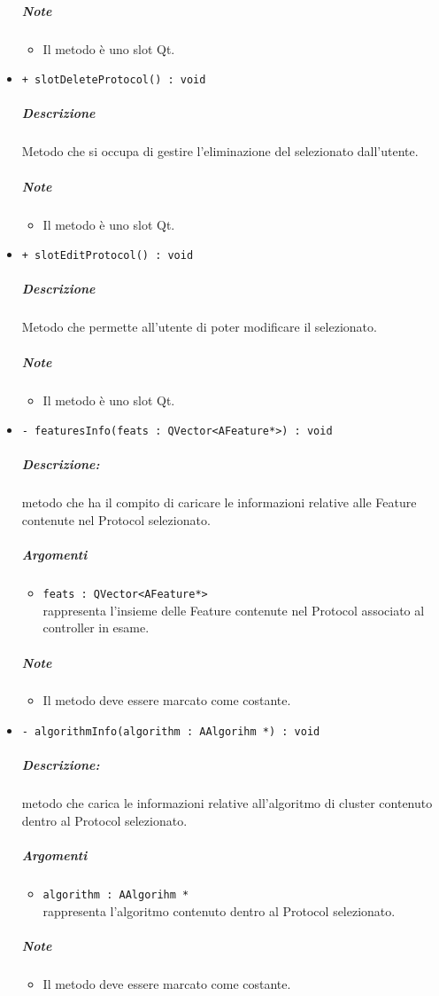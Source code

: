 \begin{itemize}
			\subparagraph{Note}
			\begin{itemize}
				\item Il metodo è uno slot\g{} Qt\g{}.
			\end{itemize}
			\item \color{blue} \verb!+ slotDeleteProtocol() : void!
			\color{black}
			\subparagraph{Descrizione} Metodo che si occupa di gestire l'eliminazione del \protocol{} selezionato dall'utente.
			\subparagraph{Note}
			\begin{itemize}
				\item Il metodo è uno slot\g{} Qt\g{}.
			\end{itemize}
			\item \color{blue} \verb!+ slotEditProtocol() : void!
			\color{black}
			\subparagraph{Descrizione} Metodo che permette all'utente di poter modificare il \protocol{} selezionato.
			\subparagraph{Note}
			\begin{itemize}
				\item Il metodo è uno slot\g{} Qt\g{}.
			\end{itemize}
			\item \color{blue} \verb!- featuresInfo(feats : QVector<AFeature*>) : void!
			\color{black}
			\subparagraph{Descrizione:} metodo che ha il compito di caricare le informazioni relative alle Feature\g{} contenute nel Protocol\g{} selezionato.
			\color{black}
			\subparagraph{Argomenti}
			\begin{itemize}
				\item \color{RoyalPurple} \verb!feats : QVector<AFeature*>!\\				
\color{black} rappresenta l'insieme delle Feature\g{}  contenute nel Protocol\g{} associato al controller in esame.
			\end{itemize}
			\subparagraph{Note}
			\begin{itemize}
				\item Il metodo deve essere marcato come costante.
			\end{itemize}
			\item \color{blue} \verb!- algorithmInfo(algorithm : AAlgorihm *) : void!
			\color{black}
			\subparagraph{Descrizione:} metodo che carica le informazioni relative all'algoritmo di cluster\g{} contenuto dentro al Protocol\g{} selezionato.
			\color{black}
			\subparagraph{Argomenti}
			\begin{itemize}
				\item \color{RoyalPurple} \verb!algorithm : AAlgorihm *!\\				
\color{black} rappresenta l'algoritmo contenuto dentro al Protocol\g{} selezionato.
			\end{itemize}
			\subparagraph{Note}
			\begin{itemize}
				\item Il metodo deve essere marcato come costante.
			\end{itemize}
		\end{itemize}
		\pagebreak
